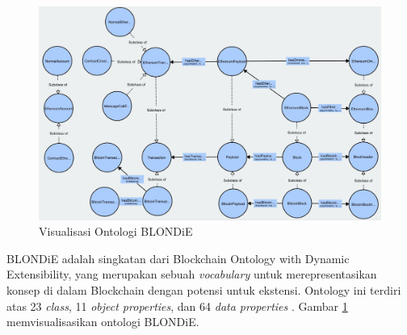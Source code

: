 \begin{figure}[ht]
  \centering
  \includegraphics[width=1\textwidth]{resources/chapter-2/blondie-visualization.jpg}
  \caption{Visualisasi Ontologi BLONDiE \parencite{third2017linked}}
  \label{image:blondie-visualization}
\end{figure}

BLONDiE adalah singkatan dari Blockchain Ontology with Dynamic Extensibility, yang merupakan sebuah \textit{vocabulary} untuk merepresentasikan konsep di dalam Blockchain dengan potensi untuk ekstensi. Ontology ini terdiri atas 23 \textit{class}, 11 \textit{object properties}, dan 64 \textit{data properties} \parencite{hector2020blondie}. Gambar \ref{image:blondie-visualization} memvisualisasikan ontologi BLONDiE.